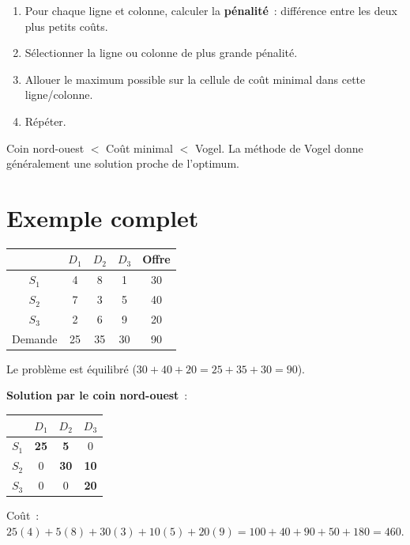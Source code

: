 \begin{algorithme}[title=\textbf{Approximation de Vogel (VAM)}]
\begin{enumerate}
  \item Pour chaque ligne et colonne, calculer la \textbf{p\'enalit\'e}~:
        diff\'erence entre les deux plus petits co\^uts.
  \item S\'electionner la ligne ou colonne de plus grande p\'enalit\'e.
  \item Allouer le maximum possible sur la cellule de co\^ut minimal dans
        cette ligne/colonne.
  \item R\'ep\'eter.
\end{enumerate}
\end{algorithme}

\begin{bonnepratique}[title=\textbf{Qualit\'e de la solution initiale}]
Coin nord-ouest $<$ Co\^ut minimal $<$ Vogel.  La m\'ethode de Vogel donne
g\'en\'eralement une solution proche de l'optimum.
\end{bonnepratique}

\section{Exemple complet}

\begin{exemple}
\begin{center}
\begin{tabular}{c|ccc|c}
  & $D_1$ & $D_2$ & $D_3$ & Offre \\
  \hline
  $S_1$ & 4 & 8 & 1 & 30 \\
  $S_2$ & 7 & 3 & 5 & 40 \\
  $S_3$ & 2 & 6 & 9 & 20 \\
  \hline
  Demande & 25 & 35 & 30 & 90 \\
\end{tabular}
\end{center}

Le probl\`eme est \'equilibr\'e ($30 + 40 + 20 = 25 + 35 + 30 = 90$).

\textbf{Solution par le coin nord-ouest}~:
\begin{center}
\begin{tabular}{c|ccc}
  & $D_1$ & $D_2$ & $D_3$ \\
  \hline
  $S_1$ & \textbf{25} & \textbf{5} & 0 \\
  $S_2$ & 0 & \textbf{30} & \textbf{10} \\
  $S_3$ & 0 & 0 & \textbf{20} \\
\end{tabular}
\end{center}

Co\^ut~: $25(4) + 5(8) + 30(3) + 10(5) + 20(9) = 100 + 40 + 90 + 50 + 180
= 460$.
\end{exemple}

